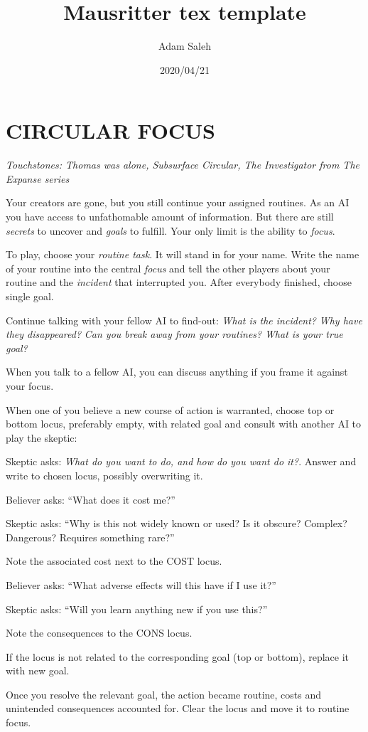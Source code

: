\documentclass[letterpaper,twocolumn,openany,nodeprecatedcode]{article}
\title{Mausritter tex template}
\author{Adam Saleh}
\date{2020/04/21}
\begin{document}
  \section{CIRCULAR FOCUS}

  \emph{Touchstones: Thomas was alone, Subsurface Circular, The Investigator from The Expanse series}

  Your creators are gone, but you still continue your assigned routines. As an AI you have access to unfathomable amount of information. But there are still \emph{secrets} to uncover and \emph{goals} to fulfill. Your only limit is the ability to \emph{focus}.


  To play, choose your \emph{routine task}. It will stand in for your name. Write the name of your routine into the central \emph{focus} and tell the other players about your routine and the \emph{incident} that interrupted you. After everybody finished, choose single goal.

  Continue talking with your fellow AI to find-out:
  \emph{What is the incident?} \emph{Why have they disappeared?} \emph{Can you break away from your routines?} \emph{What is your true goal?}

  When you talk to a fellow AI, you can discuss anything if you frame it against your focus.

  When one of you believe a new course of action is warranted, choose top or bottom locus, preferably empty, with related goal and consult with another AI to play the skeptic:

Skeptic asks: \emph{What do you want to do, and how do you want do it?}. Answer and write to chosen locus, possibly overwriting it.

Believer asks: “What does it cost me?”

Skeptic asks: “Why is this not widely known or used? Is it obscure? Complex? Dangerous? Requires something rare?”

Note the associated cost next to the COST locus.

Believer asks: “What adverse effects will this have if I use it?”

Skeptic asks: “Will you learn anything new if you use this?”

Note the consequences to the CONS locus.

If the locus is not related to the corresponding goal (top or bottom), replace it with new goal.

Once you resolve the relevant goal, the action became routine, costs and unintended consequences accounted for. Clear the locus and move it to routine focus.
\end{document}
